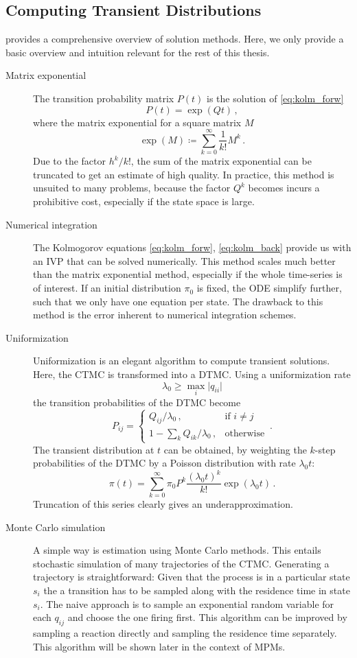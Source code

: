 \subsection{Computing Transient Distributions}
\citet{stewart1994introduction} provides a comprehensive overview of solution methods.
Here, we only provide a basic overview and intuition relevant for the rest of this thesis.
\begin{description}
	\item[Matrix exponential]
		The transition probability matrix $P(t)$ is the solution of \eqref{eq:kolm_forw}
		\[
			P(t)=\exp(Qt)\,,
		\]
		where the matrix exponential for a square matrix $M$
		\[
		\exp({M})\coloneqq\sum_{k=0}^{\infty}\frac{1}{k!}M^k\,.
	\]
		Due to the factor ${h^k}/{k!}$, the sum of the matrix exponential
		can be truncated to get an estimate
		of high quality. In practice, this method is unsuited to many problems, because
		the factor $Q^k$ becomes incurs a prohibitive cost, especially if the state space
		is large.
	\item[Numerical integration]
		The Kolmogorov equations \eqref{eq:kolm_forw}, \eqref{eq:kolm_back}
		provide us with an \ac{IVP} that can be solved
		numerically.
		This method scales much better than the matrix exponential method,
		especially if the whole time-series is of interest. If an initial distribution
		$\pi_0$ is fixed, the \ac{ODE} simplify further, such that we only have one equation
		per state.
		The drawback to this method is the error inherent to numerical 
		integration schemes.
	\item[Uniformization]\label{item:uniformization}
		Uniformization is an elegant algorithm to compute transient solutions.
		Here, the \ac{CTMC} is transformed into a \ac{DTMC}.
		Using a uniformization rate \[\lambda_0\geq\max_{i}\lvert q_{ii}\rvert\]
		the transition probabilities of the \ac{DTMC} become
		\[
		P_{ij} =
		\begin{cases}
			Q_{ij} / \lambda_0\,, &\text{if } i\neq j\\
			1 - \sum_k Q_{ik} / \lambda_0\,, &\text{otherwise}
		\end{cases}\,.
	\]
		The transient distribution at $t$ can be obtained, by weighting the $k$-step
		probabilities of the \ac{DTMC} by a Poisson distribution with rate
		$\lambda_0 t$:
		\[
		\pi(t) =
		\sum_{k=0}^{\infty}\pi_0P^k\frac{(\lambda_0 t)^k}{k!} \exp{(\lambda_0 t)}\,.
	\]
		Truncation of this series clearly gives an underapproximation.
	\item[Monte Carlo simulation]
		A simple way is estimation using Monte Carlo methods. This entails stochastic
		simulation of many trajectories of the \ac{CTMC}. Generating a trajectory is
		straightforward: Given that the process is in a particular state $s_i$
		the a transition has to be sampled along with the residence time in state
		$s_i$. The naive approach is to sample an exponential random variable for
		each $q_{ij}$ and choose the one firing first.
		This algorithm can be improved by sampling a reaction directly and
		sampling the residence time separately. This algorithm will be shown later
		in the context of \acp{MPM}.
\end{description}
